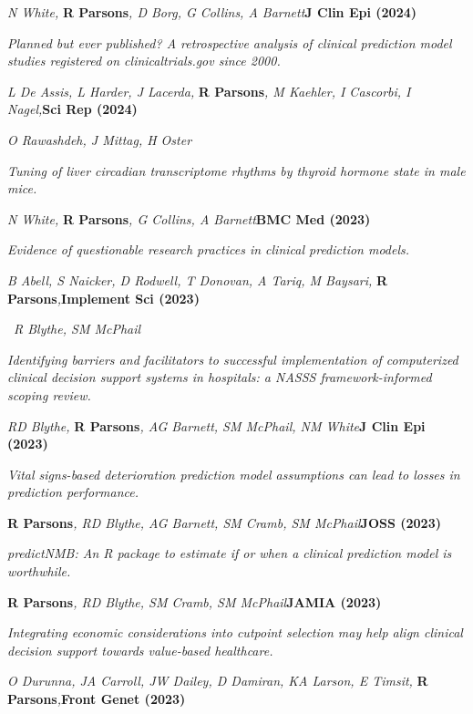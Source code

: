 \item
    \textit{N White, }\textbf{R Parsons}\textit{, D Borg, G Collins, A Barnett}\textbf{\hfill{J Clin Epi (2024)}}\par
    \textit{Planned but ever published? A retrospective analysis of clinical prediction model studies registered on clinicaltrials.gov since 2000.}
\item
	\textit{L De Assis, L Harder, J Lacerda, }\textbf{R Parsons}\textit{, M Kaehler, I Cascorbi, I Nagel,}\textbf{\hfill{Sci Rep (2024)}}\par
	\textit{O Rawashdeh, J Mittag, H Oster}\par
    \textit{Tuning of liver circadian transcriptome rhythms by thyroid hormone state in male mice.}
\item
    \textit{N White, }\textbf{R Parsons}\textit{, G Collins, A Barnett}\textbf{\hfill{BMC Med (2023)}}\par
    \textit{Evidence of questionable research practices in clinical prediction models.}
\item
    \textit{B Abell, S Naicker, D Rodwell, T Donovan, A Tariq, M Baysari, }\textbf{R Parsons}\textit{,}\textbf{\hfill{Implement Sci (2023)}}\par\
	\textit{R Blythe, SM McPhail}\par
    \textit{Identifying barriers and facilitators to successful implementation of computerized clinical decision support systems in hospitals: a NASSS framework-informed scoping review.}
\item
    \textit{RD Blythe, }\textbf{R Parsons}\textit{, AG Barnett, SM McPhail, NM White}\textbf{\hfill{J Clin Epi (2023)}}\par
    \textit{Vital signs-based deterioration prediction model assumptions can lead to losses in prediction performance.}
\item
    \textbf{R Parsons}\textit{, RD Blythe, AG Barnett, SM Cramb, SM McPhail}\textbf{\hfill{JOSS (2023)}}\par
    \textit{predictNMB: An R package to estimate if or when a clinical prediction model is worthwhile.}
\item
    \textbf{R Parsons}\textit{, RD Blythe, SM Cramb, SM McPhail}\textbf{\hfill{JAMIA (2023)}}\par
    \textit{Integrating economic considerations into cutpoint selection may help align clinical decision support towards value-based healthcare.}
\item
    \textit{O Durunna, JA Carroll, JW Dailey, D Damiran, KA Larson, E Timsit, }\textbf{R Parsons}\textit{,}\textbf{\hfill{Front Genet (2023)}}\par
